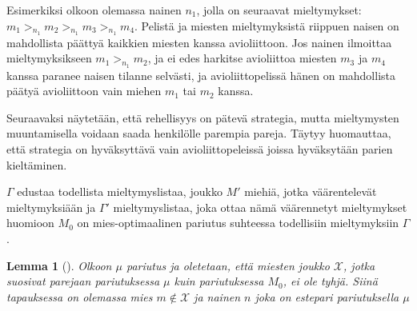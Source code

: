 \documentclass[finnish]{tktltiki2}
\newtheorem{lem}[lau]{Lemma}
\theoremstyle{definition}
\theoremstyle{remark}
\begin{document}
Esimerkiksi olkoon olemassa nainen $n_1$, jolla on seuraavat mieltymykset: $m_1 >_{n_1} m_2 >_{n_1} m_3 >_{n_1} m_4$. Pelistä ja miesten mieltymyksistä riippuen naisen on mahdollista päättyä kaikkien miesten kanssa avioliittoon. Jos nainen ilmoittaa mieltymyksikseen $m_1 >_{n_1} m_2$, ja ei edes harkitse avioliittoa miesten $m_3$ ja $m_4$ kanssa paranee naisen tilanne selvästi, ja avioliittopelissä hänen on mahdollista päätyä avioliittoon vain miehen $m_1$ tai $m_2$ kanssa.

Seuraavaksi näytetään, että rehellisyys on pätevä strategia, mutta mieltymysten muuntamisella voidaan saada henkilölle parempia pareja. Täytyy huomauttaa, että strategia on hyväksyttävä vain avioliittopeleissä joissa hyväksytään parien kieltäminen.

$\Gamma$ edustaa todellista mieltymyslistaa, joukko $M'$ miehiä, jotka väärentelevät mieltymyksiään ja $\Gamma'$ mieltymyslistaa, joka ottaa nämä väärennetyt mieltymykset huomioon $M_0$ on mies-optimaalinen pariutus suhteessa todellisiin mieltymyksiin $\Gamma$. 

\begin{lem}[\cite{gusfield1989stable}]\label{strategy-blocking}
	Olkoon $\mu$ pariutus ja oletetaan, että miesten joukko $\mathcal{X}$, jotka suosivat parejaan pariutuksessa $\mu$ kuin pariutuksessa $M_0$, ei ole tyhjä. Siinä tapauksessa on olemassa mies $m \notin \mathcal{X}$ ja nainen $n$ joka on estepari pariutuksella $\mu$
\end{lem}
\end{document}
